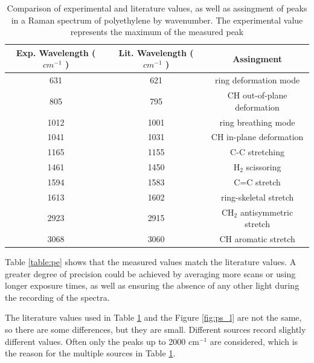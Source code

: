     \begin{table}[h]
    \begin{center}
        \vspace{15pt}
        \begin{tabular}{|c|c|c|}
         \hline
         Exp. Wavelength (\( cm^{-1} \) ) & Lit. Wavelength  (\( cm^{-1} \) ) & Assingment  \\ 
         \hline
         631 & 621 & ring deformation mode \\
         805 & 795 & CH out-of-plane deformation \\
         1012 & 1001 & ring breathing mode\\ 
         1041 & 1031 & CH in-plane deformation \\
         1165 & 1155 & C-C stretching\\
         1461 & 1450 & H\(_2\) scissoring\\
         1594 & 1583 & C=C stretch\\
         1613 & 1602 & ring-skeletal stretch\\
         2923 & 2915 & CH\(_2\) antisymmetric stretch\\
         3068 & 3060 & CH aromatic stretch  \\
         \hline
        \end{tabular}
        \caption{Comparison of experimental and literature \cite{ps1} \cite{ps2} values, as well as assingment of peaks in a Raman spectrum of polyethylene by wavenumber. The experimental value represents the maximum of the measured peak }
        \label{table:ps}
    \end{center}
    \end{table}

    Table \ref{table:pe} shows that the measured values match the literature values. A greater degree of precision could be achieved by averaging more scans or using longer exposure times, as well as ensuring the absence of any other light during the recording of the spectra.

    \bigskip
    
    The literature values used in Table \ref{table:ps} and the Figure \ref{fig:ps_l} are not the same, so there are some differences, but they are small. Different sources record slightly different values. Often only the peaks up to 2000 cm\(^{-1} \) are considered, which is the reason for the multiple sources in Table \ref{table:ps}. 
    

    \newpage

